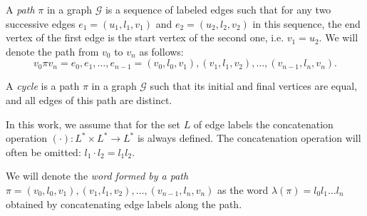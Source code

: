 \begin{definition}[A path]
	A \textit{path} $\pi$ in a graph $\mathcal{G}$ is a sequence of labeled edges such that for any two successive edges $e_1=(u_1, l_1, v_1)$ and $e_2=(u_2, l_2, v_2)$ in this sequence, the end vertex of the first edge is the start vertex of the second one, i.e. $v_1 = u_2$. We will denote the path from $v_0$ to $v_n$ as follows: $$v_0 \pi v_n = e_0, e_1, \dots, e_{n - 1} = (v_0, l_0, v_1), (v_1, l_1, v_2), \dots, (v_{n - 1}, l_n, v_n).$$
\end{definition}

\begin{definition}[A cycle]
	A \textit{cycle} is a path $\pi$ in a graph $\mathcal{G}$ such that its initial and final vertices are equal, and all edges of this path are distinct.
\end{definition}

In this work, we assume that for the set $L$ of edge labels the concatenation operation $(\cdot): L^* \times L^* \to L^*$ is always defined. The concatenation operation will often be omitted: $l_1 \cdot l_2 = l_1l_2$.

\begin{definition}
	We will denote the \textit{word formed by a path} $\pi = (v_0, l_0, v_1), (v_1, l_1, v_2), \dots, (v_{n - 1}, l_n, v_n)$ as the word $\lambda(\pi) = l_0 l_1 \ldots l_n$ obtained by concatenating edge labels along the path.
\end{definition}

